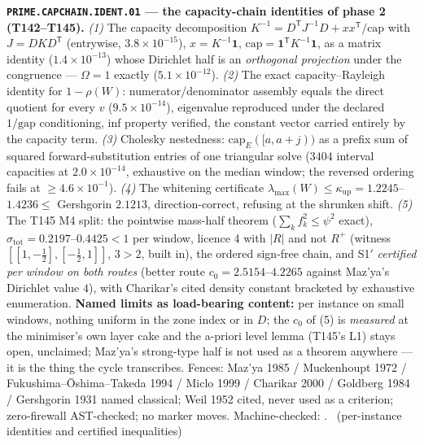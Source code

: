 \documentclass[11pt,a4paper]{article}
\begin{document}
\par\smallskip\noindent\textbf{\texttt{PRIME.CAPCHAIN.IDENT.01} --- the
capacity-chain identities of phase 2 (T142--T145).}
\emph{(1)} The capacity decomposition
$K^{-1}=D^{\mathsf T}J^{-1}D+xx^{\mathsf T}/\mathrm{cap}$ with
$J=DKD^{\mathsf T}$ (entrywise, $3.8\times10^{-15}$), $x=K^{-1}\mathbf 1$,
$\mathrm{cap}=\mathbf 1^{\mathsf T}K^{-1}\mathbf 1$, as a matrix identity
($1.4\times10^{-13}$) whose Dirichlet half is an \emph{orthogonal projection}
under the congruence --- $\Omega=1$ exactly ($5.1\times10^{-12}$). \emph{(2)} The
exact capacity--Rayleigh identity for $1-\rho(W)$: numerator/denominator
assembly equals the direct quotient for every $v$ ($9.5\times10^{-14}$),
eigenvalue reproduced under the declared $1/\mathrm{gap}$ conditioning, inf
property verified, the constant vector carried entirely by the capacity term.
\emph{(3)} Cholesky nestedness: $\mathrm{cap}_E([a,a{+}j))$ as a prefix sum of
squared forward-substitution entries of one triangular solve ($3404$ interval
capacities at $2.0\times10^{-14}$, exhaustive on the median window; the reversed
ordering fails at $\ge4.6\times10^{-1}$). \emph{(4)} The whitening certificate
$\lambda_{\max}(W)\le\kappa_{\mathrm{up}}=1.2245$--$1.4236\le$ Gershgorin
$2.1213$, direction-correct, refusing at the shrunken shift. \emph{(5)} The T145
M4 split: the pointwise mass-half theorem ($\sum_kf_k^2\le\psi^2$ exact),
$\sigma_{\mathrm{tot}}=0.2197$--$0.4425<1$ per window, licence 4 with $|R|$ and
not $R^{+}$ (witness $[[1,-\tfrac12],[-\tfrac12,1]]$, $3>2$, built in), the
ordered sign-free chain, and S1$'$ \emph{certified per window on both routes}
(better route $c_0=2.5154$--$4.2265$ against Maz'ya's Dirichlet value $4$), with
Charikar's cited density constant bracketed by exhaustive enumeration.
\textbf{Named limits as load-bearing content:} per instance on small windows,
nothing uniform in the zone index or in $D$; the $c_0$ of (5) is
\emph{measured} at the minimiser's own layer cake and the a-priori level lemma
(T145's L1) stays open, unclaimed; Maz'ya's strong-type half is not used as a
theorem anywhere --- it is the thing the cycle transcribes. Fences: Maz'ya 1985 /
Muckenhoupt 1972 / Fukushima--\=Oshima--Takeda 1994 / Miclo 1999 / Charikar
2000 / Goldberg 1984 / Gershgorin 1931 named classical; Weil 1952 cited, never
used as a criterion; zero-firewall AST-checked; no marker moves.
Machine-checked: .
\mE\ (per-instance identities and certified inequalities)
\end{document}

